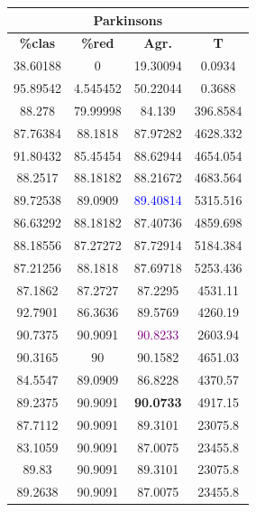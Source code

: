 \documentclass[11pt,a4paper]{article}
\theoremstyle{definition}
\begin{document}
\begin{tabbing}
{		\begin{tabular}{|c|c|c|c|}
			\hline
			\multicolumn{4}{|c|}{\textbf{Parkinsons}} \\ \hline
			\textbf{\%clas} & \textbf{\%red} & \textbf{Agr.} & \textbf{T} \\ \hline 
			38.60188	&0	        &19.30094	&0.0934\\ \hline
95.89542&	4.545452	&50.22044	&0.3688\\ \hline
88.278	 & 79.99998	&84.139	  &396.8584\\ \hline
87.76384 & 88.1818 & 87.97282 & 4628.332\\ \hline
91.80432 & 85.45454 & 88.62944 & 4654.054\\ \hline
88.2517 & 88.18182 & 88.21672 & 4683.564\\ \hline
89.72538 & 89.0909 & \textcolor{blue}{89.40814} & 5315.516\\ \hline
86.63292 & 88.18182 & 87.40736 & 4859.698\\ \hline
88.18556 & 87.27272 & 87.72914 & 5184.384\\ \hline
87.21256 & 88.1818 & 87.69718 & 5253.436\\ \hline
87.1862 & 87.2727 & 87.2295 & 4531.11 \\ \hline
92.7901 & 86.3636 & 89.5769 & 4260.19 \\ \hline
90.7375 & 90.9091 & \textcolor{purple}{90.8233} & 2603.94 \\ \hline
90.3165 & 90 & 90.1582 & 4651.03 \\ \hline
84.5547 & 89.0909 & 86.8228 & 4370.57 \\ \hline
89.2375 & 90.9091 & \textbf{90.0733} & 4917.15 \\ \hline
87.7112 & 90.9091 & 89.3101 & 23075.8 \\ \hline
83.1059 & 90.9091 & 87.0075 & 23455.8 \\ \hline
89.83 & 90.9091 & 89.3101 & 23075.8 \\ \hline
89.2638 & 90.9091 & 87.0075 & 23455.8 \\ \hline
		\end{tabular}
		
}
\end{tabbing}
\end{document}
